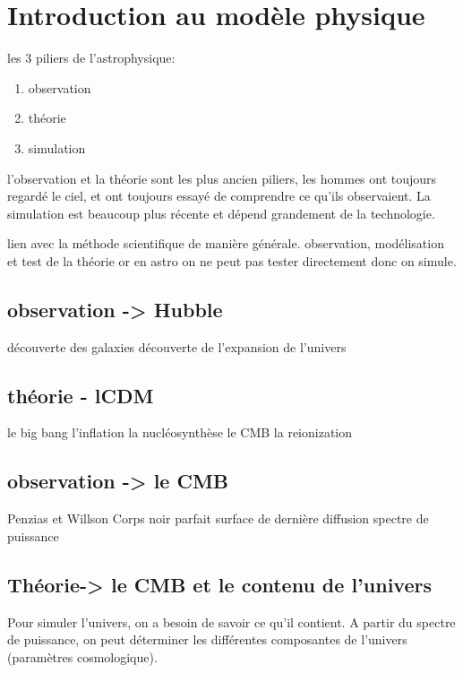 \chapter{Introduction au modèle physique }\label{ch:introduction}

les 3 piliers de l'astrophysique:

\begin{enumerate}
\item observation
\item théorie
\item simulation
\end{enumerate}


l'observation et la théorie sont les plus ancien piliers, les hommes ont toujours regardé le ciel, et ont toujours essayé de comprendre ce qu'ils observaient. La simulation est beaucoup plus récente et dépend grandement de la technologie.

lien avec la méthode scientifique de manière générale. observation, modélisation et test de la théorie or en astro on ne peut pas tester directement donc on simule.

\section{observation -> Hubble}

découverte des galaxies
découverte de l'expansion de l'univers


\section{théorie - lCDM}

le big bang
l'inflation
la nucléosynthèse
le CMB
la reionization


\section{observation -> le CMB}

Penzias et Willson
Corps noir parfait
surface de dernière diffusion
spectre de puissance

\section{Théorie-> le CMB et le contenu de l'univers}

Pour simuler l'univers, on a besoin de savoir ce qu'il contient. A partir du spectre de puissance, on peut déterminer les différentes composantes de l'univers (paramètres cosmologique).

